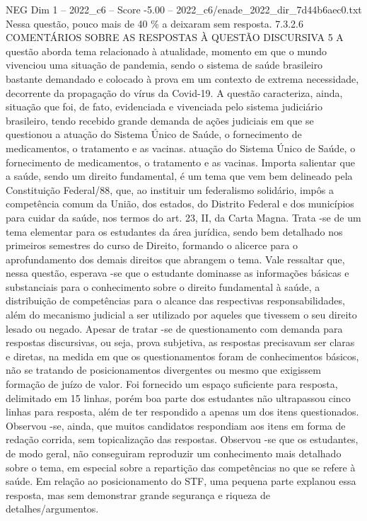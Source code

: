 \begin{textsample}{NEG Dim 1 – 2022\_c6 – Score -5.00 – 2022\_c6/enade\_2022\_dir\_7d44b6aec0.txt}
Nessa questão, pouco mais de 40 \% a deixaram sem resposta. 7.3.2.6 COMENTÁRIOS SOBRE AS RESPOSTAS À QUESTÃO DISCURSIVA 5 A questão aborda tema relacionado à atualidade, momento em que o mundo vivenciou uma situação de pandemia, sendo o sistema de saúde brasileiro bastante demandado e colocado à prova em um contexto de extrema necessidade, decorrente da propagação do vírus da Covid-19.
A questão caracteriza, ainda, situação que foi, de fato, evidenciada e vivenciada pelo sistema judiciário brasileiro, tendo recebido grande demanda de ações judiciais em que se questionou a atuação do Sistema Único de Saúde, o fornecimento de medicamentos, o tratamento e as vacinas. atuação do Sistema Único de Saúde, o fornecimento de medicamentos, o tratamento e as vacinas.
Importa salientar que a saúde, sendo um direito fundamental, é um tema que vem bem delineado pela Constituição Federal/88, que, ao instituir um federalismo solidário, impôs a competência comum da União, dos estados, do Distrito Federal e dos municípios para cuidar da saúde, nos termos do art. 23, II, da Carta Magna.
Trata -se de um tema elementar para os estudantes da área jurídica, sendo bem detalhado nos primeiros semestres do curso de Direito, formando o alicerce para o aprofundamento dos demais direitos que abrangem o tema.
Vale ressaltar que, nessa questão, esperava -se que o estudante dominasse as informações básicas e substanciais para o conhecimento sobre o direito fundamental à saúde, a distribuição de competências para o alcance das respectivas responsabilidades, além do mecanismo judicial a ser utilizado por aqueles que tivessem o seu direito lesado ou negado.
Apesar de tratar -se de questionamento com demanda para respostas discursivas, ou seja, prova subjetiva, as respostas precisavam ser claras e diretas, na medida em que os questionamentos foram de conhecimentos básicos, não se tratando de posicionamentos divergentes ou mesmo que exigissem formação de juízo de valor.
Foi fornecido um espaço suficiente para resposta, delimitado em 15 linhas, porém boa parte dos estudantes não ultrapassou cinco linhas para resposta, além de ter respondido a apenas um dos itens questionados.
Observou -se, ainda, que muitos candidatos respondiam aos itens em forma de redação corrida, sem topicalização das respostas.
Observou -se que os estudantes, de modo geral, não conseguiram reproduzir um conhecimento mais detalhado sobre o tema, em especial sobre a repartição das competências no que se refere à saúde.
Em relação ao posicionamento do STF, uma pequena parte explanou essa resposta, mas sem demonstrar grande segurança e riqueza de detalhes/argumentos.

\end{textsample}
